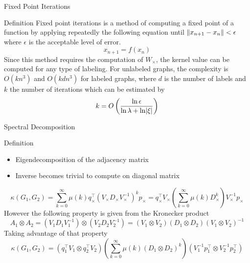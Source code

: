 \documentclass[compress]{beamer}
\DeclarePairedDelimiter{\abs}{\lvert}{\rvert}
\DeclarePairedDelimiter{\norm}{\lVert}{\rVert}
\begin{document}
\begin{frame}{Fixed Point Iterations}
\begin{block}{Definition}
Fixed point iterations is a method of computing a fixed point of a function by applying repeatedly the following equation until $\norm{x_{n+1}-x_{n}}<\epsilon$ where $\epsilon$ is the acceptable level of error.
\begin{equation*}
x_{n+1} = f(x_n)
\end{equation*}
Since this method requires the computation of $W_\times$, the kernel value can be computed for any type of labeling. For unlabeled graphs, the complexity is $O(kn^3)$ and $O(kdn^3)$ for labeled graphs, where $d$ is the number of labels and $k$ the number of iterations which can be estimated by
\begin{equation*}
k=O\left(\frac{\ln \epsilon}{\ln \lambda + \ln \abs{\xi}}\right)
\end{equation*}
\end{block}
\end{frame}
\begin{frame}{Spectral Decomposition}
\begin{block}{Definition}
	\begin{itemize}
		\item Eigendecomposition of the adjacency matrix
		\item Inverse becomes trivial to compute on diagonal matrix
	\end{itemize}
	\begin{equation*}
		 \kappa(G_1,G_2)=\sum\limits_{k=0}^{\infty}\mu(k)q_{\times}^{\top}(V_{\times}D_{\times}V_{\times}^{-1})^{k}p_{\times} = q_{\times}^{\top}V_{\times}\left(\sum\limits_{k=0}^{\infty}\mu(k)D_{\times}^{k}\right)V_{\times}^{-1}p_{\times}
	\end{equation*}
	However the following property is given from the Kronecker product
	\begin{equation*}
		A_1 \otimes A_2=(V_{1}D_{1}V_{1}^{-1})\otimes(V_{2}D_{2}V_{2}^{-1})=(V_1\otimes V_2)(D_1 \otimes D_2)(V_1 \otimes V_2)^{-1}
	\end{equation*}
	Taking advantage of that property
	\begin{equation}
	\kappa(G_1,G_2)=(q_{1}^{\top}V_{1}\otimes q_{2}^{\top}V_{2})(\sum\limits_{k=0}^{\infty}\mu(k)(D_{1}\otimes D_{2})^k)(V_{1}^{-1}p_{1}^{\top}\otimes V_{2}^{-1}p_{2}^{\top})
	\end{equation}
\end{block}
\end{frame}
\end{document}
